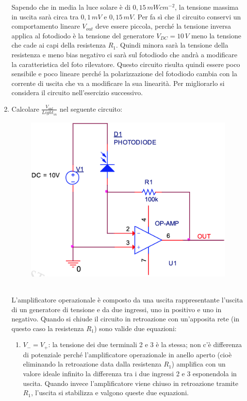 \documentclass[12pt, a4paper]{report}
\begin{document}
\begin{appendices}
\begin{enumerate}
\begin{equation*}
    \end{equation*}
    Sapendo che in media la luce solare è di $0,15\,mWcm^{-2}$, la tensione massima in uscita sarà circa tra $0,1\,mV$ e $0,15\,mV$. Per fa sì che il circuito conservi un comportamento lineare $V_{out}$ deve essere piccola, perché la tensione inversa applica al fotodiodo è la tensione del generatore $V_{DC} = 10\,V$ meno la tensione che cade ai capi della resistenza $R_1$. Quindi minora sarà la tensione della resistenza e meno bias negativo ci sarà sul fotodiodo che andrà a modificare la caratteristica del foto rilevatore. Questo circuito risulta quindi essere poco sensibile e poco lineare perché la polarizzazione del fotodiodo cambia con la corrente di uscita che va a modificare la sua linearità. Per migliorarlo si considera il circuito nell'esercizio successivo.
    \item Calcolare $\frac{V_{out}}{Light_{in}}$ nel seguente circuito:
    \begin{figure}[h]
        \centering
       \includegraphics[scale=0.3,angle=0]{diodi_es3.png}
    \end{figure}
    \\L'amplificatore operazionale è composto da una uscita rappresentante l'uscita di un generatore di tensione e da due ingressi, uno in positivo e uno in negativo. Quando si chiude il circuito in retroazione con un'apposita rete (in questo caso la resistenza $R_1$) sono valide due equazioni:
    \begin{enumerate}
        \item $V_{-} = V_{+}$: la tensione dei due terminali 2 e 3 è la stessa; non c'è differenza di potenziale perché l'amplificatore operazionale in anello aperto (cioè eliminando la retroazione data dalla resistenza $R_1$) amplifica con un valore ideale infinito la differenza tra i due ingressi 2 e 3 esponendola in uscita. Quando invece l'amplificatore viene chiuso in retroazione tramite $R_1$, l'uscita si stabilizza e valgono queste due equazioni.

\end{enumerate}
\end{enumerate}
\end{appendices}
\end{document}
